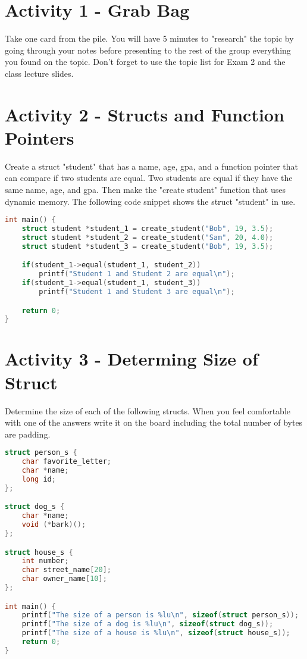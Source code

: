 \documentclass[]{article}
\begin{document}
\section*{Activity 1 - Grab Bag}
Take one card from the pile. You will have 5 minutes to "research" the topic by going through your
notes before presenting to the rest of the group everything you found on the topic. Don't forget
to use the topic list for Exam 2 and the class lecture slides.

\section*{Activity 2 - Structs and Function Pointers}
Create a struct "student" that has a name, age, gpa, and a function pointer that can compare if
two students are equal. Two students are equal if they have the same name, age, and gpa. Then 
make the "create student" function that uses dynamic memory. The following code snippet shows the 
struct "student" in use.

\begin{lstlisting}[language=C]
int main() {
    struct student *student_1 = create_student("Bob", 19, 3.5);
    struct student *student_2 = create_student("Sam", 20, 4.0);
    struct student *student_3 = create_student("Bob", 19, 3.5);

    if(student_1->equal(student_1, student_2))
        printf("Student 1 and Student 2 are equal\n");
    if(student_1->equal(student_1, student_3))
        printf("Student 1 and Student 3 are equal\n");

    return 0;
}
\end{lstlisting}

\section*{Activity 3 - Determing Size of Struct}
Determine the size of each of the following structs. When you feel comfortable with one of the
answers write it on the board including the total number of bytes are padding.

\begin{lstlisting}[language=C]
struct person_s {
    char favorite_letter;
    char *name;
    long id;
};

struct dog_s {
    char *name;
    void (*bark)();
};

struct house_s {
    int number;
    char street_name[20];
    char owner_name[10];
};

int main() {
    printf("The size of a person is %lu\n", sizeof(struct person_s));
    printf("The size of a dog is %lu\n", sizeof(struct dog_s));
    printf("The size of a house is %lu\n", sizeof(struct house_s));
    return 0;
}
\end{lstlisting}
\end{document}
